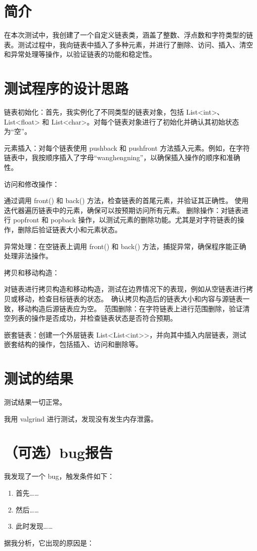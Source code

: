 \documentclass[UTF8]{ctexart}
\begin{document}
\pagestyle{fancy}
\fancyhead{}

\section{简介}

在本次测试中，我创建了一个自定义链表类，涵盖了整数、浮点数和字符类型的链表。测试过程中，我向链表中插入了多种元素，并进行了删除、访问、插入、清空和异常处理等操作，以验证链表的功能和稳定性。

\section{测试程序的设计思路}

链表初始化：首先，我实例化了不同类型的链表对象，包括 List<int>、List<float> 和 List<char>。对每个链表对象进行了初始化并确认其初始状态为“空”。

元素插入：对每个链表使用 pushback 和 pushfront 方法插入元素。例如，在字符链表中，我按顺序插入了字母“wanghengning”，以确保插入操作的顺序和准确性。

访问和修改操作：

通过调用 front() 和 back() 方法，检查链表的首尾元素，并验证其正确性。
使用迭代器遍历链表中的元素，确保可以按预期访问所有元素。
删除操作：对链表进行 popfront 和 popback 操作，以测试元素的删除功能。尤其是对字符链表的操作，删除后验证链表大小和元素状态。

异常处理：在空链表上调用 front() 和 back() 方法，捕捉异常，确保程序能正确处理非法操作。

拷贝和移动构造：

对链表进行拷贝构造和移动构造，测试在边界情况下的表现，例如从空链表进行拷贝或移动，检查目标链表的状态。\
确认拷贝构造后的链表大小和内容与源链表一致，移动构造后源链表应为空。\
范围删除：在字符链表上进行范围删除，验证清空列表的操作是否成功，并检查链表状态是否符合预期。\

嵌套链表：创建一个外层链表 List<List<int>>，并向其中插入内层链表，测试嵌套结构的操作，包括插入、访问和删除等。\

\section{测试的结果}

测试结果一切正常。

我用 valgrind 进行测试，发现没有发生内存泄露。

\section{（可选）bug报告}

我发现了一个 bug，触发条件如下：

\begin{enumerate}
    \item 首先……
    \item 然后……
    \item 此时发现……
\end{enumerate}

据我分析，它出现的原因是：
\end{document}
